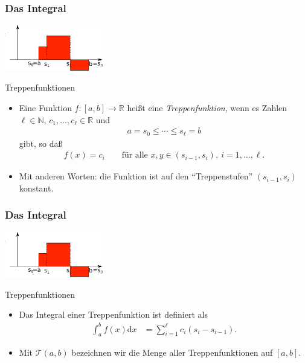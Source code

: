 \documentclass{beamer}
\renewcommand{\emph}[1]{{\textcolor{solarizedRed}{\itshape #1}}}
\newcommand\dd{\mathrm d}
\newcommand\cT{\mathcal T}
\newcommand\NN{\mathbb N}
\newcommand\RR{\mathbb R}
\newcommand{\ue}{\"u}
\newcommand{\mytitle}{Das Integral}
\begin{document}
\begin{frame}\frametitle{\mytitle}
\hfill	\includegraphics[height=20mm]{pics/int2.pdf}
	\begin{block}{Treppenfunktionen}
		\begin{itemize}
			\item Eine Funktion $f:[a,b]\to\RR$ hei\ss t eine \emph{Treppenfunktion}, wenn es Zahlen $\ell\in\NN$, $c_1,\ldots,c_\ell\in\RR$ und
				\begin{align*}
				a=s_0\leq\cdots\leq s_\ell=b
				\end{align*}
				gibt, so da\ss
				\begin{align*}
					f(x)=c_i\qquad\mbox{f\ue r alle }x,y\in(s_{i-1},s_{i}),\ i=1,\ldots,\ell.
				\end{align*}
			\item Mit anderen Worten: die Funktion ist auf den ``Treppenstufen'' $(s_{i-1},s_i)$ konstant.
		\end{itemize}
	\end{block}
\end{frame}

\begin{frame}\frametitle{\mytitle}
\hfill	\includegraphics[height=20mm]{pics/int2.pdf}
	\begin{block}{Treppenfunktionen}
		\begin{itemize}
	\item Das Integral einer Treppenfunktion ist definiert als
		\begin{align*}
			\int_a^b f(x)\dd x&=\sum_{i=1}^\ell c_i(s_i-s_{i-1}).
		\end{align*}
	\item Mit $\cT(a,b)$ bezeichnen wir die Menge aller Treppenfunktionen auf $[a,b]$.
		\end{itemize}
	\end{block}
\end{frame}
\end{document}
